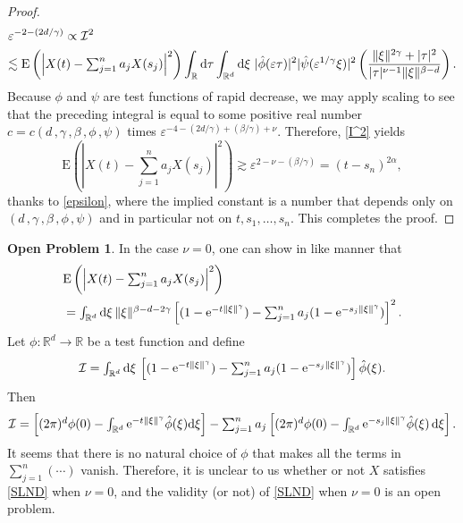 \documentclass[reqno]{amsart}
\newcommand{\<}{\langle}
\renewcommand{\>}{\rangle}
\newcommand{\R}{\mathbb{R}}
\newcommand{\E}{\mathrm{E}}
\newcommand{\1}{\mathbb{1}}
\renewcommand{\d}{{\rm d}}
\newcommand{\e}{{\rm e}}
\theoremstyle{definition}
\newtheorem{OP}[stat]{Open Problem}
\numberwithin{equation}{section}
\begin{document}
\begin{proof}
\begin{align}
		&\varepsilon^{-2-(2d/\gamma)}\propto \mathcal{I}^2 \label{I^2}\\\notag
		&{\textstyle
			\lesssim \E\left( \left| X(t) - \sum_{j=1}^n a_j X(s_j)\right|^2 \right)}
			\int_{\R}\d\tau
			\int_{\R^d}\d\xi\
			|\hat{\phi} (\varepsilon\tau)|^2 |\hat{\psi}(\varepsilon^{1/\gamma}\xi)|^2 
			\left(\frac{\|\xi\|^{2\gamma} + |\tau|^2}{|\tau|^{\nu-1}\|\xi\|^{\beta-d}}\right).
	\end{align}
	Because $\phi$ and $\psi$ are test functions of rapid decrease, we
	may apply scaling to see that the preceding integral is equal to some positive real number
	$c=c(d\,,\gamma\,,\beta\,,\phi\,,\psi)$ times $\varepsilon^{-4-(2d/\gamma)+(\beta/\gamma)+\nu}$.
	Therefore, \eqref{I^2} yields
	\[\textstyle
		\E\left(\left| X(t) - \sum_{j=1}^n a_j X(s_j)\right|^2 \right)
		\gtrsim\varepsilon^{2-\nu-(\beta/\gamma)} = (t-s_n)^{2\alpha},
	\]
	thanks to \eqref{epsilon}, where the implied constant is a number that depends only on 
	$(d\,,\gamma\,,\beta\,,\phi\,,\psi)$ and in particular not on 
	$t,s_1,\ldots,s_n$. This completes the proof.
\end{proof}

\begin{OP}
	In the case $\nu=0$, one can show in like manner that
	\begin{align*}
		&\textstyle\E\left(\left| X(t) - \sum_{j=1}^n a_j X(s_j)\right|^2 \right)\\
		&\textstyle=\int_{\R^d} \d \xi \,\|\xi\|^{\beta-d-2\gamma} 
			\left[ (1-\e^{-t\|\xi\|^\gamma}) - \sum_{j=1}^n a_j(1-\e^{-s_j\|\xi\|^\gamma}) \right]^2.
	\end{align*}
	Let $\phi:\R^d\to\R$ be a test function and define
	\[\textstyle
		\mathcal{I} = \int_{\R^d} \d \xi \,\left[ (1-\e^{-t\|\xi\|^\gamma}) 
		- \sum_{j=1}^n a_j(1-\e^{-s_j\|\xi\|^\gamma}) \right] \hat{\phi}(\xi).
	\]
	Then
	\[\textstyle
		\mathcal{I} = \left[ (2\pi)^d\phi(0) - \int_{\R^d} \e^{-t\|\xi\|^\gamma} 
		\hat{\phi}(\xi) \d \xi \right] - \sum_{j=1}^n a_j \left[
		(2\pi)^d\phi(0)-\int_{\R^d} \e^{-s_j\|\xi\|^\gamma}\hat{\phi}(\xi)\, \d \xi\right].
	\]
	It seems that there is no natural choice of $\phi$ that makes all the terms in 
	$\sum_{j=1}^n (\cdots)$ vanish.
	Therefore, it is unclear to us whether or not $X$ satisfies \eqref{SLND} when $\nu=0$,
	and the validity (or not) of \eqref{SLND} when $\nu=0$ is  an open problem.
\end{OP}
\end{document}
